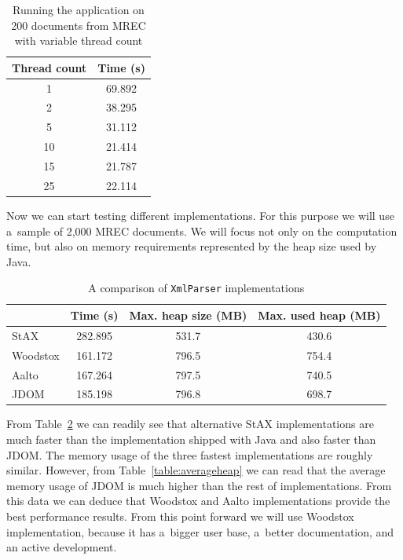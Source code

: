 \documentclass[11pt,oneside,final]{fithesis2}
\begin{document}
\begin{table}[!ht]
\centering
\begin{tabular}{|c|c|}
\hline
Thread count & Time (s) \\ \hline
\hline
1 & 69.892 \\ \hline
2 & 38.295 \\ \hline
5 & 31.112 \\ \hline
10 & 21.414 \\ \hline
15 & 21.787 \\ \hline
25 & 22.114 \\ \hline
\end{tabular}
\caption{Running the application on 200 documents from MREC with variable thread count}
\label{table:threadcount}
\end{table}

Now we can start testing different implementations. For this purpose we will use a~sample of 2,000 MREC documents. We will focus not only on the computation time, but also on memory requirements represented by the heap size used by Java.

\begin{table}[!ht]
\centering
\begin{tabular}{|l|c|c|c|}
\hline
& Time (s) & Max. heap size (MB) & Max. used heap (MB) \\ \hline
\hline
StAX & 282.895 & 531.7 & 430.6 \\ \hline
Woodstox & 161.172 & 796.5 & 754.4 \\ \hline
Aalto & 167.264 & 797.5 & 740.5 \\ \hline
JDOM & 185.198 & 796.8 & 698.7 \\ \hline
\end{tabular}
\caption{A comparison of \texttt{XmlParser} implementations}
\label{table:comparison}
\end{table}

From Table~\ref{table:comparison} we can readily see that alternative StAX implementations are much faster than the implementation shipped with Java and also faster than JDOM. The memory usage of the three fastest implementations are roughly similar. However, from Table~\ref{table:averageheap} we can read that the average memory usage of JDOM is much higher than the rest of implementations. From this data we can deduce that Woodstox and Aalto implementations provide the best performance results. From this point forward we will use Woodstox implementation, because it has a~bigger user base, a~better documentation, and an active development.
\end{document}
